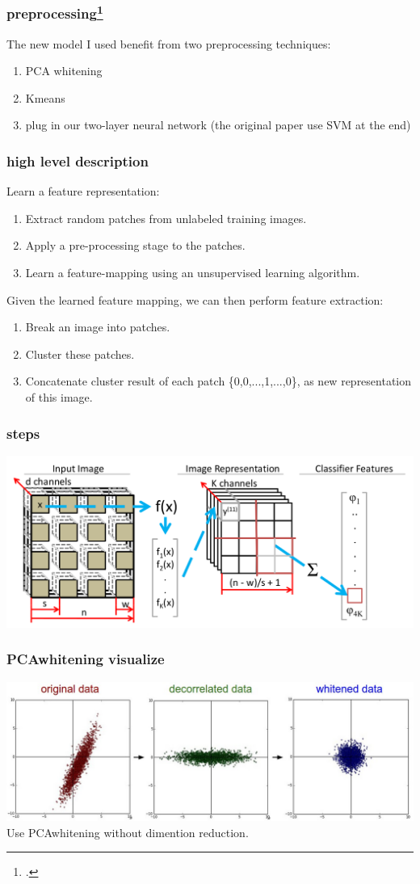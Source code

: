 \documentclass{beamer}
\begin{document}
\begin{frame}
\frametitle{preprocessing\footcite{coates2011analysis}}
The new model I used benefit from two preprocessing techniques:
\begin{enumerate}
 \item PCA whitening
 \item Kmeans
 \item plug in our two-layer neural network (the original paper use SVM at the end)
\end{enumerate}
\end{frame}
\begin{frame}
\frametitle{high level description}
Learn a feature representation:
\begin{enumerate}
\item Extract random patches from unlabeled training images.
\item Apply a pre-processing stage to the patches.
\item Learn a feature-mapping using an unsupervised learning algorithm.
\end{enumerate}
Given the learned feature mapping, we can then perform feature extraction:
\begin{enumerate}
\item Break an image into patches.
\item Cluster these patches. 
\item Concatenate cluster result of each patch \{0,0,...,1,...,0\}, as new representation of this image.
\end{enumerate}
\end{frame}
\begin{frame}
\frametitle{steps}
\includegraphics[width=\textwidth]{kmeans.png} 
\end{frame}
\begin{frame}
\frametitle{PCAwhitening visualize}
\includegraphics[width=\textwidth]{pca.jpeg}
Use PCAwhitening without dimention reduction.
\end{frame}
\end{document}
